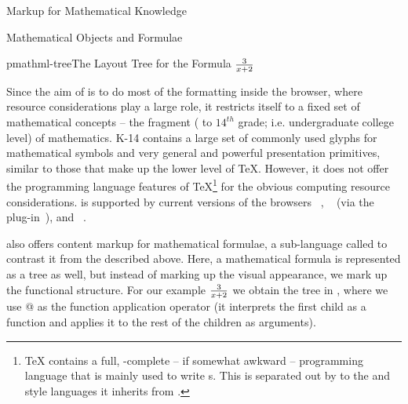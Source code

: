 \begin{tchapter}[id=math-markup]{Markup for Mathematical Knowledge}
\begin{tsection}[id=math-objects]{Mathematical Objects and Formulae}
\begin{tsubsection}[id=math-markup:mathml]{{\mathml}}
\begin{myfig}{pmathml-tree}{The Layout Tree for the Formula $3\over x+2$}
\begin{minipage}{8cm}
\end{minipage}  
\end{myfig}

Since the aim of {\mathml} is to do most of the formatting inside the browser, where
resource considerations play a large role, it restricts itself to a fixed set of
mathematical concepts -- the {} fragment ({} to
$14^{th}$ grade; i.e. undergraduate college level) of mathematics. K-14 contains a large
set of commonly used glyphs for mathematical symbols and very general and powerful
presentation primitives, similar to those that make up the lower level of {\TeX}.
However, it does not offer the programming language features of {\TeX}\footnote{{\TeX}
  contains a full, {}-complete -- if somewhat awkward -- programming
  language that is mainly used to write {}s.  This is separated out
  by {\mathml} to the {\css} and {\xslt} style languages it inherits from {\xml}.}  for
the obvious computing resource considerations.  {\pmathml} is supported by current
versions of the browsers {\amaya}~\cite{amaya_web}, {\msie}~\cite{ie_web} (via the
{\mathplayer} plug-in~\cite{mathplayer_web}), and {\mozilla}~\cite{mozilla_web}.

  {\mathml} also offers content markup for mathematical formulae, a sub-language called
  {} to contrast it from the {} described
  above. Here, a mathematical formula is represented as a tree as well, but instead of
  marking up the visual appearance, we mark up the functional structure. For our example
  $3\over x+2$ we obtain the tree in {}, where we use @ as the
  function application operator (it interprets the first child as a function and applies
  it to the rest of the children as arguments).


\end{tsubsection}
\end{tsection}
\end{tchapter}
